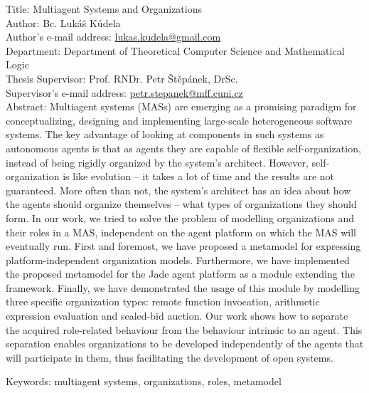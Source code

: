 
Title: Multiagent Systems and Organizations\\
Author: Bc. Lukáš Kúdela\\
Author's e-mail address: \url{lukas.kudela@gmail.com}\\
Department: Department of Theoretical Computer Science and Mathematical Logic\\
Thesis Supervisor: Prof. RNDr. Petr Štěpánek, DrSc.\\
Supervisor's e-mail address: \url{petr.stepanek@mff.cuni.cz}\\

Abstract: Multiagent systems (MASs) are emerging as a promising paradigm for conceptualizing, designing and implementing large-scale heterogeneous software systems.
The key advantage of looking at components in such systems as autonomous agents is that as agents they are capable of flexible self-organization, instead of being rigidly organized by the system's architect.
However, self-organization is like evolution -- it takes a lot of time and the results are not guaranteed.
More often than not, the system's architect has an idea about how the agents should organize themselves -- what types of organizations they should form.
In our work, we tried to solve the problem of modelling organizations and their roles in a MAS, independent on the agent platform on which the MAS will eventually run.
First and foremost, we have proposed a metamodel for expressing platform-independent organization models.
Furthermore, we have implemented the proposed metamodel for the Jade agent platform as a module extending the framework.
Finally, we have demonstrated the usage of this module by modelling three specific organization types: remote function invocation, arithmetic expression evaluation and sealed-bid auction.
Our work shows how to separate the acquired role-related behaviour from the behaviour intrinsic to an agent. 
This separation enables organizations to be developed independently of the agents that will participate in them, thus facilitating the development of open systems.

Keywords: multiagent systems, organizations, roles, metamodel